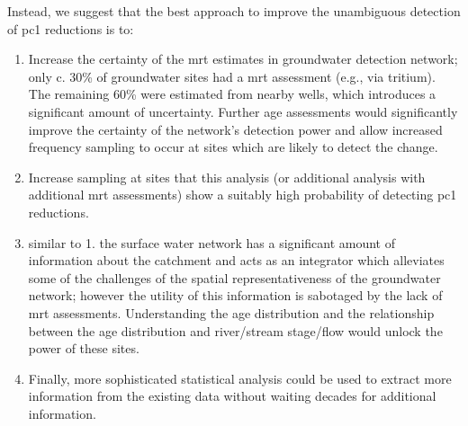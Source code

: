 Instead, we suggest that the best approach to improve the unambiguous detection of \gls{pc1} reductions is to:
\begin{enumerate}
    \item Increase the certainty of the \gls{mrt} estimates in groundwater detection network; only c. 30\% of groundwater sites had a \gls{mrt} assessment (e.g., via tritium).  The remaining 60\% were estimated from nearby wells, which introduces a significant amount of uncertainty. Further age assessments would significantly improve the certainty of the network's detection power and allow increased frequency sampling to occur at sites which are likely to detect the change.
    \item Increase sampling at sites that this analysis (or additional analysis with additional \gls{mrt} assessments) show a suitably high probability of detecting \gls{pc1} reductions.
    \item similar to 1. the surface water network has a significant amount of information about the catchment and acts as an integrator which alleviates some of the challenges of the spatial representativeness of the groundwater network\citep{olw_guidance}; however the utility of this information is sabotaged by the lack of \gls{mrt} assessments. Understanding the age distribution and the relationship between the age distribution and river/stream stage/flow would unlock the power of these sites.
    \item Finally, more sophisticated statistical analysis could be used to extract more information from the existing data without waiting decades for additional information.
\end{enumerate}